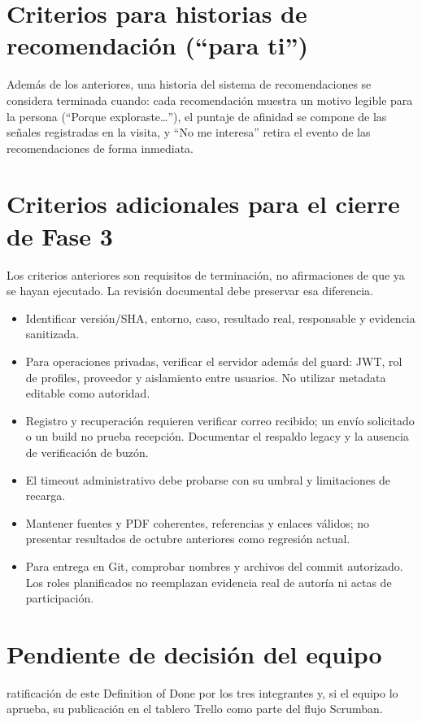 \documentclass[11pt,a4paper]{article}
\begin{document}
\section{Criterios para historias de recomendación (``para ti'')}

Además de los anteriores, una historia del sistema de recomendaciones se
considera terminada cuando: cada recomendación muestra un motivo legible para
la persona (``Porque exploraste\ldots''), el puntaje de afinidad se compone de
las señales registradas en la visita, y ``No me interesa'' retira el evento de
las recomendaciones de forma inmediata.

\section{Criterios adicionales para el cierre de Fase 3}
Los criterios anteriores son requisitos de terminación, no afirmaciones de que ya
se hayan ejecutado. La revisión documental debe preservar esa diferencia.
\begin{itemize}
\item Identificar versión/SHA, entorno, caso, resultado real, responsable y evidencia sanitizada.
\item Para operaciones privadas, verificar el servidor además del guard: JWT, rol de profiles,
proveedor y aislamiento entre usuarios. No utilizar metadata editable como autoridad.
\item Registro y recuperación requieren verificar correo recibido; un envío solicitado o un
build no prueba recepción. Documentar el respaldo legacy y la ausencia de verificación de buzón.
\item El timeout administrativo debe probarse con su umbral y limitaciones de recarga.
\item Mantener fuentes y PDF coherentes, referencias y enlaces válidos; no presentar
resultados de octubre anteriores como regresión actual.
\item Para entrega en Git, comprobar nombres y archivos del commit autorizado. Los roles
planificados no reemplazan evidencia real de autoría ni actas de participación.
\end{itemize}

\section{Pendiente de decisión del equipo}

\begin{pendienteenv}
ratificación de este Definition of Done por los tres integrantes y, si el
equipo lo aprueba, su publicación en el tablero Trello como parte del flujo
Scrumban.
\end{pendienteenv}
\end{document}
